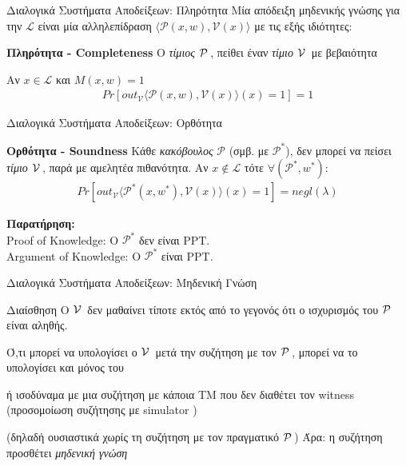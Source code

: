\documentclass[10pt,handout]{beamer}
\begin{document}
\begin{frame}{Διαλογικά Συστήματα Αποδείξεων: Πληρότητα}
Μία απόδειξη μηδενικής γνώσης για την $ \mathcal{L} $ είναι μία αλληλεπίδραση $\langle\mathcal{P}(x,w), \mathcal{V}(x) \rangle$ με τις εξής ιδιότητες: \pause

\begin{block}{\textbf{Πληρότητα - Completeness}}  
Ο \emph{τίμιος} $\mathcal{P}\,$, πείθει έναν \emph{τίμιο} $\mathcal{V}\,$ με  βεβαιότητα \pause

Αν  $x \in \mathcal{L}$ και $M(x,w) = 1$
\begin{align*}
Pr[out_{\mathcal{V}} \langle \mathcal{P}(x,w), \mathcal{V}(x) \rangle (x)=1] = 1  
\end{align*}
\end{block} 
\end{frame}

\begin{frame}{Διαλογικά Συστήματα Αποδείξεων: Ορθότητα}
\begin{block}{\textbf{Ορθότητα - Soundness}}
Κάθε \emph{κακόβουλος} $\mathcal{P}$ (σμβ. με $\mathcal{P}^*$), δεν μπορεί να πείσει \emph{τίμιο} $\mathcal{V}\,$, παρά με αμελητέα πιθανότητα.
\pause
Αν $x \notin \mathcal{L}$ τότε $\forall (\mathcal{P}^*,w^*)$: 
\pause
\begin{align*}
Pr[out_{\mathcal{V}} \langle \mathcal{P}^*(x,w^*), \mathcal{V}(x) \rangle (x)=1] = negl(\lambda)
\end{align*} 
\end{block}
\pause
\textbf{Παρατήρηση: }\\
Proof of Knowledge: O $\mathcal{P}^*$ \alert{δεν} είναι PPT. \\
Argument of Knowledge: O $\mathcal{P}^*$  είναι PPT.
\end{frame}

\begin{frame}{Διαλογικά Συστήματα Αποδείξεων: Μηδενική Γνώση}

\begin{block}{Διαίσθηση}
	O $\mathcal{V}\,$ δεν μαθαίνει \alert{τίποτε εκτός από το γεγονός ότι ο ισχυρισμός του $\mathcal{P}\,$ είναι αληθής}. \pause
	 
	Ό,τι μπορεί να υπολογίσει ο $\mathcal{V}\,$ μετά την συζήτηση με τον $\mathcal{P}\,$, μπορεί να το υπολογίσει και \alert{μόνος} του
	
	ή ισοδύναμα με μια συζήτηση με κάποια TM που δεν διαθέτει τον witness \pause
	(προσομοίωση συζήτησης με simulator \siml) 
	 
	(δηλαδή ουσιαστικά χωρίς τη συζήτηση με τον πραγματικό $\mathcal{P}\,$)
	\pause
	Άρα: η συζήτηση προσθέτει \emph{μηδενική γνώση}
	
	\end{block}
\end{frame}
\end{document}
